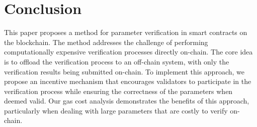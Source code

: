 \documentclass[runningheads]{llncs}
\begin{document}
\section{Conclusion}
\label{sec:conclusion}
This paper proposes a method for parameter verification in smart contracts on the blockchain. The method addresses the challenge of performing computationally expensive verification processes directly on-chain. The core idea is to offload the verification process to an off-chain system, with only the verification results being submitted on-chain. To implement this approach, we propose an incentive mechanism that encourages validators to participate in the verification process while ensuring the correctness of the parameters when deemed valid. Our gas cost analysis demonstrates the benefits of this approach, particularly when dealing with large parameters that are costly to verify on-chain.
\newpage


\end{document}
